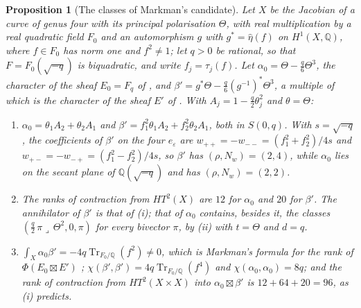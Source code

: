 \documentclass[11pt,reqno]{amsart}
\theoremstyle{plain}
\newtheorem{proposition}[theorem]{Proposition}
\theoremstyle{definition}
\theoremstyle{remark}
\newcommand{\QQ}{\mathbb{Q}}
\DeclareMathOperator{\Tr}{Tr}
\begin{document}
\begin{proposition}[The classes of Markman's candidate]
\label{prop:markmanquarticclasses}
Let $X$ be the Jacobian of a curve of genus four with its principal
polarisation $\Theta$, with real multiplication by a real quadratic field
$F_{0}$ and an automorphism $g$ with $g^{*}=\hat\eta(f)$ on $H^{1}(X,\QQ)$,
where $f\in F_{0}$ has norm one and $f^{2}\ne1$; let $q>0$ be rational, so
that $F=F_{0}(\sqrt{-q})$ is biquadratic, and write $f_{j}=\tau_{j}(f)$. Let
$\alpha_{0}=\Theta-\frac q6\Theta^{3}$, the character of the sheaf $E_{0}=F_{q}$
of \cite[Example~8.2.4]{Mar25a}, and
$\beta'=g^{*}\Theta-\frac q6(g^{-1})^{*}\Theta^{3}$, a multiple of which is the
character of the sheaf $E'$ of \cite[Example~11.2.7]{Mar25c}. With
$A_{j}=1-\frac q2\theta_{j}^{2}$ and $\theta=\Theta$:
\begin{enumerate}[label=\textup{(\roman*)},leftmargin=2.6em,itemsep=2pt]
\item $\alpha_{0}=\theta_{1}A_{2}+\theta_{2}A_{1}$ and
  $\beta'=f_{1}^{2}\theta_{1}A_{2}+f_{2}^{2}\theta_{2}A_{1}$, both in $S(0,q)$.
  With $s=\sqrt{-q}$, the coefficients of $\beta'$ on the four
  $e_{\varepsilon}$ are $w_{++}=-w_{--}=(f_{1}^{2}+f_{2}^{2})/4s$ and
  $w_{+-}=-w_{-+}=(f_{1}^{2}-f_{2}^{2})/4s$, so $\beta'$ has
  $(\rho,N_{w})=(2,4)$, while $\alpha_{0}$ lies on the secant plane of
  $\QQ(\sqrt{-q})$ and has $(\rho,N_{w})=(2,2)$.
\item The ranks of contraction from $HT^{2}(X)$ are $12$ for $\alpha_{0}$ and
  $20$ for $\beta'$. The annihilator of $\beta'$ is that of
  (i); that of $\alpha_{0}$ contains, besides it, the
  classes $(\frac q2\,\pi\lrcorner\,\Theta^{2},0,\pi)$ for every bivector
  $\pi$, by (ii) with $t=\Theta$ and $d=q$.
\item $\int_{X}\alpha_{0}\beta'=-4q\Tr_{F_{0}/\QQ}(f^{2})\ne0$, which is
  Markman's formula for the rank of $\Phi(E_{0}\boxtimes E')$
  \cite[Lemma~11.2.8]{Mar25c}; $\chi(\beta',\beta')=4q\Tr_{F_{0}/\QQ}(f^{4})$ and
  $\chi(\alpha_{0},\alpha_{0})=8q$; and the rank of contraction from
  $HT^{2}(X\times X)$ into $\alpha_{0}\boxtimes\beta'$ is $12+64+20=96$, as
  (i) predicts.
\end{enumerate}
\end{proposition}
\end{document}
